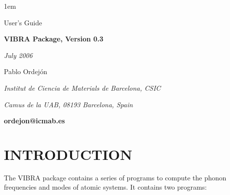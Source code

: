%



\textheight 22cm
\textwidth 16cm
\oddsidemargin 1mm
\topmargin -15mm

\baselineskip=14pt
\parskip 5pt
\parindent 1em




\begin{titlepage}

\begin{center}

\vspace{1cm}

{\huge {\sc User's Guide}}

\vspace{3cm}

{\Huge {\bf VIBRA Package, Version 0.3}}

\vspace{3cm}

{\Large {\it July 2006}}

\vspace{3cm}

{\Large Pablo Ordej\'on}

\vspace{5pt}

{\it Institut de Ciencia de Materials de Barcelona, CSIC}

{\it Camus de la UAB, 08193 Barcelona, Spain}

\vspace{5pt}

{\bf ordejon@icmab.es}


\end{center}

\end{titlepage}


%



\section{INTRODUCTION}

\noindent
The VIBRA package contains a series of programs to compute the
phonon frequencies and modes of atomic systems. It contains two 
programs:

